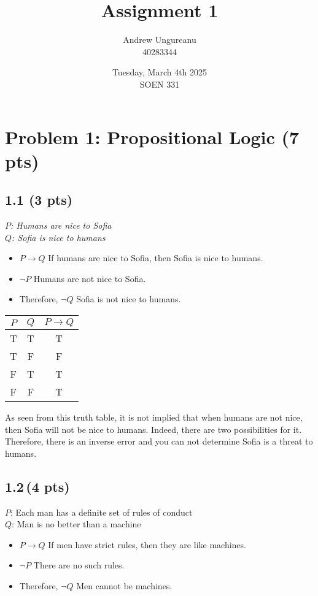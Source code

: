 \documentclass[12pt]{article}
\title{Assignment 1 \\\vspace{1in}}
\author{Andrew Ungureanu \\
        40283344\\\vspace{1in}}
\date{Tuesday, March 4th 2025\\
            SOEN 331}
\begin{document}
\maketitle

\newpage
\section{Problem 1: Propositional Logic (7 pts)}

\subsection*{1.1 (3 pts)}
\textit{$P$: Humans are nice to Sofia\\
$Q$: Sofia is nice to humans}
\begin{itemize}

    \item  $P \rightarrow Q$ If humans are nice to Sofia, then Sofia is nice to humans.
    \item $\neg P$ Humans are not nice to Sofia.
    \item Therefore, $\neg Q$ Sofia is not nice to humans.
\end{itemize}
\begin{center}
    \begin{tabular}{|c|c|c|}
        \hline
        $P$ & $Q$ & $P \rightarrow Q$ \\
        \hline
        T & T & T \\
        T & F & F \\
        F & T & T \\
        F & F & T \\
        \hline
    \end{tabular}
\end{center}

As seen from this truth table, it is not implied that when humans are not nice, then Sofia will not be nice to humans. Indeed, there are two possibilities for it. Therefore, there is an inverse error and you can not determine Sofia is a threat to humans.


\subsection*{1.2\,(4 pts)}
\textit{}{$P$: Each man has a definite set of rules of conduct
\\$Q$: Man is no better than a machine}
\begin{itemize}

    \item  $P \rightarrow Q$ If men have strict rules, then they are like machines.
    \item $\neg P$ There are no such rules.
    \item Therefore, $\neg Q$ Men cannot be machines.
\end{itemize}
\end{document}
